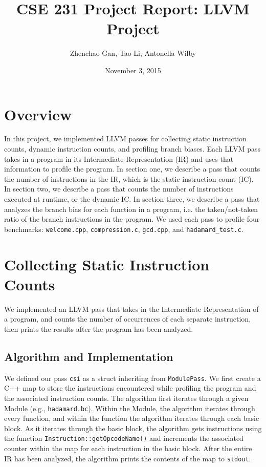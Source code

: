 \documentclass[12pt]{article}
\begin{document}
\title{CSE 231 Project Report: LLVM Project}
\author{Zhenchao Gan, Tao Li, Antonella Wilby}
\date{November 3, 2015}
\maketitle

\section*{Overview}

In this project, we implemented LLVM passes for collecting static instruction counts, dynamic instruction counts, and profiling branch biases. Each LLVM pass takes in a program in its Intermediate Representation (IR) and uses that information to profile the program. In section one, we describe a pass that counts the number of instructions in the IR, which is the static instruction count (IC). In section two, we describe a pass that counts the number of instructions executed at runtime, or the dynamic IC. In section three, we describe a pass that analyzes the branch bias for each function in a program, i.e. the taken/not-taken ratio of the branch instructions in the program. We used each pass to profile four benchmarks: {\tt welcome.cpp}, {\tt compression.c}, {\tt gcd.cpp}, and {\tt hadamard\_test.c}.

\section{Collecting Static Instruction Counts}

We implemented an LLVM pass that takes in the Intermediate Representation of a program, and counts the number of occurrences of each separate instruction, then prints the results after the program has been analyzed.

\subsection{Algorithm and Implementation}

We defined our pass {\tt csi} as a struct inheriting from {\tt ModulePass}. We first create a C++ map to store the instructions encountered while profiling the program and the associated instruction counts. The algorithm first iterates through a given Module (e.g., {\tt hadamard.bc}). Within the Module, the algorithm iterates through every function, and within the function the algorithm iterates through each basic block. As it iterates through the basic block, the algorithm gets instructions using the function {\tt Instruction::getOpcodeName()} and increments the associated counter within the map for each instruction in the basic block. After the entire IR has been analyzed, the algorithm prints the contents of the map to {\tt stdout}.
\end{document}
